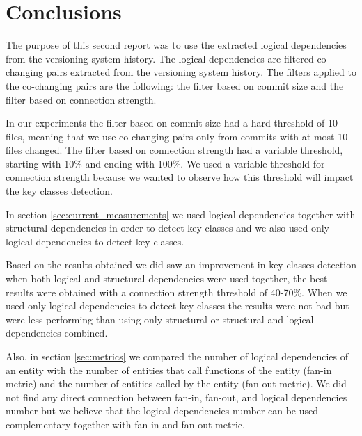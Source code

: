 \documentclass[12pt]{mitthesis}
\begin{document}
\chapter{Conclusions}

The purpose of this second report was to use the extracted logical dependencies from the versioning system history.
The logical dependencies are filtered co-changing pairs extracted from the versioning system history. The filters applied to the co-changing pairs are the following: the filter based on commit size and the filter based on connection strength.

In our experiments the filter based on commit size had a hard threshold of 10 files, meaning that we use co-changing pairs only from commits with at most 10 files changed. The filter based on connection strength had a variable threshold, starting with 10\% and ending with 100\%. We used a variable threshold for connection strength because we wanted to observe how this threshold will impact the key classes detection.

In section \ref{sec:current_measurements} we used logical dependencies together with structural dependencies in order to detect key classes and we also used only logical dependencies to detect key classes.

Based on the results obtained we did saw an improvement in key classes detection when both logical and structural dependencies were used together, the best results were obtained with a connection strength threshold of 40-70\%. When we used only logical dependencies to detect key classes the results were not bad but were less performing than using only structural or structural and logical dependencies combined. 

Also, in section \ref{sec:metrics} we compared the number of logical dependencies of an entity with the number of entities that call functions of the entity (fan-in metric) and the number of entities called by the entity (fan-out metric). We did not find any direct connection between fan-in, fan-out, and logical dependencies number but we believe that the logical dependencies number can be used complementary together with fan-in and fan-out metric. 




\end{document}
